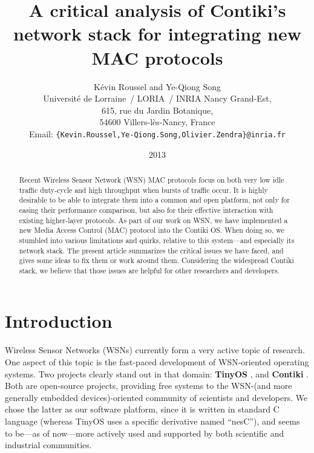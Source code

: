 \documentclass[12pt,a4paper]{article}
\begin{document}

\title{A critical analysis of Contiki's network stack
       for integrating new MAC protocols}

\author{
K\'evin Roussel and Ye-Qiong Song\\
Universit\'e de Lorraine~/ LORIA~/ INRIA Nancy Grand-Est,\\
615, rue du Jardin Botanique,\\
54600 Villers-l\`es-Nancy, France\\
Email: \texttt{\{Kevin.Roussel,Ye-Qiong.Song,Olivier.Zendra\}@inria.fr}
}

\date{2013}

\maketitle


\begin{abstract}
Recent Wireless Sensor Network (WSN) MAC protocols focus on both very low
idle traffic duty-cycle and high throughput when bursts of traffic occur.
It is highly desirable to be able to integrate them into a common and open
platform, not only for easing their performance comparison, but also
for their effective interaction with existing higher-layer protocols.
As part of our work on WSN, we have implemented a new Media Access Control
(MAC) protocol into the Contiki OS. When doing so, we stumbled into various
limitations and quirks, relative to this system---and especially
its network stack. The present article summarizes the critical issues
we have faced, and gives some ideas to fix them or work around them.
Considering the widespread Contiki stack, we believe that those issues
are helpful for other researchers and developers.
\end{abstract}

\newcommand{\term}[1]{\textbf{#1}}



\section{Introduction}

Wireless Sensor Networks (WSNs) currently form a very active topic of
research. One aspect of this topic is the fast-paced development of
WSN-oriented operating systems.
Two projects clearly stand out in that domain: \term{TinyOS} \cite{tiny-os},
and \term{Contiki} \cite{contiki} \cite{contiki-web-site}.
Both are open-source projects, providing free\footnotemark{}
systems to the WSN-(and more generally embedded devices)-oriented community
of scientists and developers. We chose the latter as our software platform,
since it is written in standard C language (whereas TinyOS uses a specific
derivative named ``nesC''), and seems to be---as of now---more actively
used and supported by both scientific and industrial communities.
\end{document}
